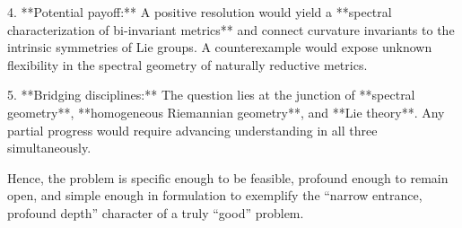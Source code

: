 4. **Potential payoff:**  
   A positive resolution would yield a **spectral characterization of bi-invariant metrics** and connect curvature invariants to the intrinsic symmetries of Lie groups. A counterexample would expose unknown flexibility in the spectral geometry of naturally reductive metrics.

5. **Bridging disciplines:**  
   The question lies at the junction of **spectral geometry**, **homogeneous Riemannian geometry**, and **Lie theory**. Any partial progress would require advancing understanding in all three simultaneously.

Hence, the problem is specific enough to be feasible, profound enough to remain open, and simple enough in formulation to exemplify the “narrow entrance, profound depth” character of a truly “good” problem.